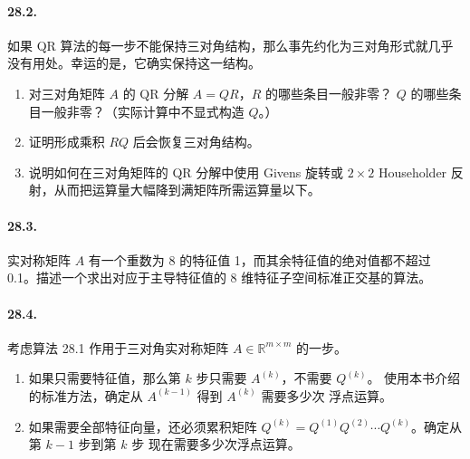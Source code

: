 \documentclass[UTF8,fontset=none,12pt]{ctexart}
\begin{document}
\paragraph{28.2.}
如果 QR 算法的每一步不能保持三对角结构，那么事先约化为三对角形式就几乎
没有用处。幸运的是，它确实保持这一结构。

\begin{enumerate}[label=(\alph*)]
  \item 对三对角矩阵 $A$ 的 QR 分解 $A=QR$，$R$ 的哪些条目一般非零？
  $Q$ 的哪些条目一般非零？（实际计算中不显式构造 $Q$。）
  \item 证明形成乘积 $RQ$ 后会恢复三对角结构。
  \item 说明如何在三对角矩阵的 QR 分解中使用 Givens 旋转或 $2\times2$
  Householder 反射，从而把运算量大幅降到满矩阵所需运算量以下。
\end{enumerate}

\paragraph{28.3.}
实对称矩阵 $A$ 有一个重数为 8 的特征值 1，而其余特征值的绝对值都不超过
0.1。描述一个求出对应于主导特征值的 8 维特征子空间标准正交基的算法。

\paragraph{28.4.}
考虑算法 28.1 作用于三对角实对称矩阵 $A\in\mathbb{R}^{m\times m}$ 的一步。

\begin{enumerate}[label=(\alph*)]
  \item 如果只需要特征值，那么第 $k$ 步只需要 $A^{(k)}$，不需要 $Q^{(k)}$。
  使用本书介绍的标准方法，确定从 $A^{(k-1)}$ 得到 $A^{(k)}$ 需要多少次
  浮点运算。
  \item 如果需要全部特征向量，还必须累积矩阵
  $Q^{(k)}=Q^{(1)}Q^{(2)}\cdots Q^{(k)}$。确定从第 $k-1$ 步到第 $k$ 步
  现在需要多少次浮点运算。
\end{enumerate}
\end{document}
